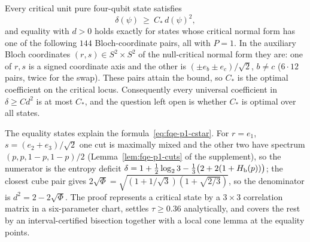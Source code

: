 \begin{theorem}
\label{thm:fqe-p1-sharp}
Every critical unit pure four-qubit state satisfies
\[
 \delta(\psi)\ \ge\ C_*\,d(\psi)^2 ,
\]
and equality with $d>0$ holds exactly for states whose critical normal form has
one of the following $144$ Bloch-coordinate pairs, all with $P=1$. In the auxiliary Bloch coordinates $(r,s)\in S^2\times S^2$ of the null-critical normal form they are: one of $r,s$ is a signed
coordinate axis and the other is $(\pm e_b\pm e_c)/\sqrt2$, $b\ne c$ ($6\cdot12$ pairs, twice for the swap).
These pairs attain the bound, so $C_*$ is the optimal coefficient on the critical locus. Consequently every universal coefficient in
$\delta\ge Cd^2$ is at most $C_*$, and the question left open is whether $C_*$ is optimal over all states.
\end{theorem}

\noindent The equality states explain the formula~\eqref{eq:fqe-p1-cstar}. For $r=e_1$, $s=(e_2+e_3)/\sqrt2$ one cut is maximally
mixed and the other two have spectrum $(p,p,1-p,1-p)/2$ (Lemma~\ref{lem:fqe-p1-cuts} of the supplement), so the
numerator is the entropy deficit $\delta=1+\frac12\log_23-\frac13\bigl(2+2(1+H_{\rm b}(p))\bigr)$; the closest cube pair gives
$2\sqrt\Phi=\sqrt{(1+1/\sqrt3)(1+\sqrt{2/3})}$, so the denominator is $d^2=2-2\sqrt\Phi$.
The proof represents a critical state by a $3\times3$
correlation matrix in a six-parameter chart, settles $\tau\ge0.36$ analytically, and covers the rest by an
interval-certified bisection together with a local cone lemma at the equality points.


